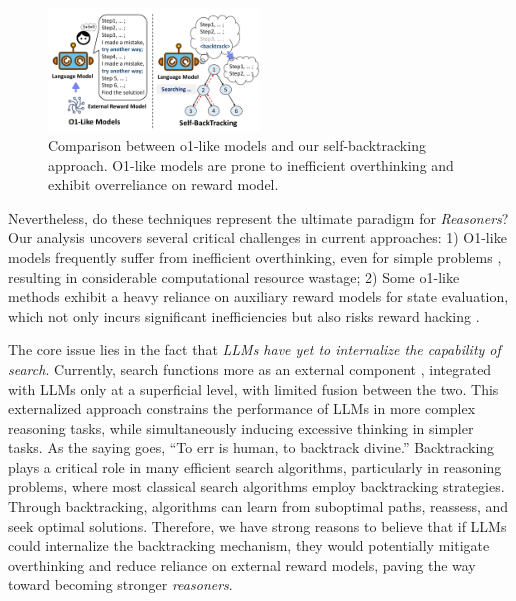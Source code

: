 \documentclass{article}
\theoremstyle{plain}
\theoremstyle{definition}
\theoremstyle{remark}
\begin{document}
\begin{figure}[t]
    \centering
    \includegraphics[width=0.50\textwidth]{fig/intro.pdf}
    \caption{
       Comparison between o1-like models and our self-backtracking approach. O1-like models are prone to inefficient overthinking and exhibit overreliance on reward model.
        }
    \label{intro}
    \end{figure}
Nevertheless, do these techniques represent the ultimate paradigm for \textit{Reasoners}? Our analysis uncovers several critical challenges in current approaches: 1) O1-like models frequently suffer from inefficient overthinking, even for simple problems \cite{overthink}, resulting in considerable computational resource wastage; 2) Some o1-like methods \cite{choi2023kcts,zhang2024rest,qin2024o1} exhibit a heavy reliance on auxiliary reward models for state evaluation, which not only incurs significant inefficiencies but also risks reward hacking \cite{chen2024odin}.


The core issue lies in the fact that \textit{LLMs have yet to internalize the capability of search}. Currently, search functions more as an external component \cite{sos,zhang2024rest}, integrated with LLMs only at a superficial level, with limited fusion between the two. 
This externalized approach constrains the performance of LLMs in more complex reasoning tasks, while simultaneously inducing excessive thinking in simpler tasks. As the saying goes, “To err is human, to backtrack divine.” Backtracking \cite{van2006backtracking} plays a critical role in many efficient search algorithms, particularly in reasoning problems, where most classical search algorithms employ backtracking strategies. Through backtracking, algorithms can learn from suboptimal paths, reassess, and seek optimal solutions. Therefore, we have strong reasons to believe that if LLMs could internalize the backtracking mechanism, they would potentially mitigate overthinking and reduce reliance on external reward models, paving the way toward becoming stronger \textit{reasoners}.
\end{document}

